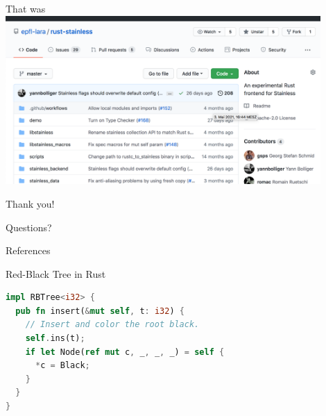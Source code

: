 \begin{frame}{That was}
\centering
\includegraphics[width=0.9\textwidth]{img/github.png}
\end{frame}

\begin{frame}[standout]
Thank you!
\end{frame}

\begin{frame}[standout]
Questions?
\end{frame}


\begin{frame}[allowframebreaks]{References}
  
  
\end{frame}


\appendix

\begin{frame}[fragile]{Red-Black Tree in Rust}
\begin{lstlisting}[language=Rust, caption={Insert method}]
impl RBTree<i32> {
  pub fn insert(&mut self, t: i32) {
    // Insert and color the root black.
    self.ins(t);
    if let Node(ref mut c, _, _, _) = self {
      *c = Black;
    }
  }
}
\end{lstlisting}
\end{frame}

